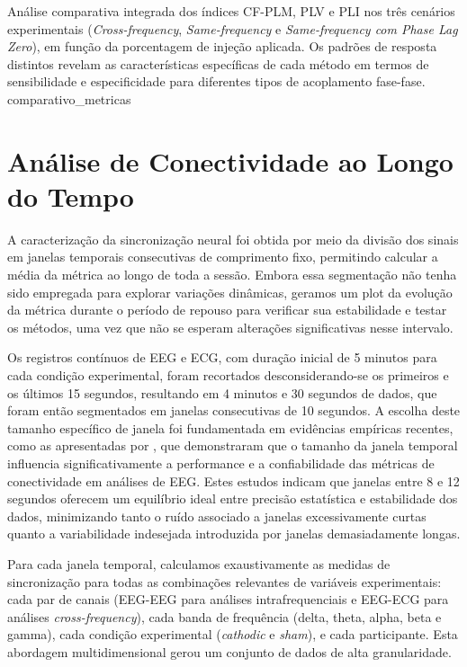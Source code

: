 {Análise comparativa integrada dos índices CF-PLM, PLV e PLI nos três cenários experimentais (\textit{Cross-frequency}, \textit{Same-frequency} e \textit{Same-frequency com Phase Lag Zero}), em função da porcentagem de injeção aplicada. Os padrões de resposta distintos revelam as características específicas de cada método em termos de sensibilidade e especificidade para diferentes tipos de acoplamento fase-fase.}
{comparativo_metricas}

\section{Análise de Conectividade ao Longo do Tempo}
\label{sec:connectivity_over_time}
A caracterização da sincronização neural foi obtida por meio da divisão dos sinais em janelas temporais consecutivas de comprimento fixo, permitindo calcular a média da métrica ao longo de toda a sessão. Embora essa segmentação não tenha sido empregada para explorar variações dinâmicas, geramos um plot da evolução da métrica durante o período de repouso para verificar sua estabilidade e testar os métodos, uma vez que não se esperam alterações significativas nesse intervalo.

Os registros contínuos de EEG e ECG, com duração inicial de 5 minutos para cada condição experimental, foram recortados desconsiderando-se os primeiros e os últimos 15 segundos, resultando em 4 minutos e 30 segundos de dados, que foram então segmentados em janelas consecutivas de 10 segundos. A escolha deste tamanho específico de janela foi fundamentada em evidências empíricas recentes, como as apresentadas por , que demonstraram que o tamanho da janela temporal influencia significativamente a performance e a confiabilidade das métricas de conectividade em análises de EEG. Estes estudos indicam que janelas entre 8 e 12 segundos oferecem um equilíbrio ideal entre precisão estatística e estabilidade dos dados, minimizando tanto o ruído associado a janelas excessivamente curtas quanto a variabilidade indesejada introduzida por janelas demasiadamente longas.

Para cada janela temporal, calculamos exaustivamente as medidas de sincronização para todas as combinações relevantes de variáveis experimentais: cada par de canais (EEG-EEG para análises intrafrequenciais e EEG-ECG para análises \textit{cross-frequency}), cada banda de frequência (delta, theta, alpha, beta e gamma), cada condição experimental (\textit{cathodic} e \textit{sham}), e cada participante. Esta abordagem multidimensional gerou um conjunto de dados de alta granularidade.

